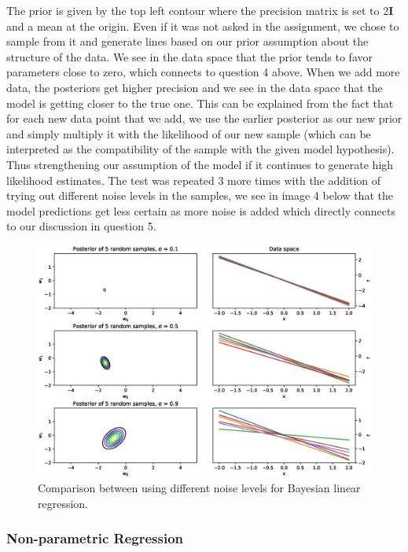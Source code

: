 \documentclass[a4paper]{article}
\begin{document}
\noindent The prior is given by the top left contour where the precision matrix is set to 2$\mathbf{I}$ and a mean at the origin. Even if it was not asked in the assignment, we chose to sample from it and generate lines based on our prior assumption about the structure of the data. We see in the data space that the prior tends to favor parameters close to zero, which connects to question 4 above. When we add more data, the posteriors get higher precision and we see in the data space that the model is getting closer to the true one. This can be explained from the fact that for each new data point that we add, we use the earlier posterior as our new prior and simply multiply it with the likelihood of our new sample (which can be interpreted as the compatibility of the sample with the given model hypothesis). Thus strengthening our assumption of the model if it continues to generate high likelihood estimates. The test was repeated 3 more times with the addition of trying out different noise levels in the samples, we see in image 4 below that the model predictions get less certain as more noise is added which directly connects to our discussion in question 5.

\begin{figure}[H]
	\centering
	\includegraphics[width=1\textwidth]{foo2.eps}
	\caption{\label{fig:frog} Comparison between using different noise levels for Bayesian linear regression.}
\end{figure}

\newpage

\subsubsection{Non-parametric Regression}
\end{document}
